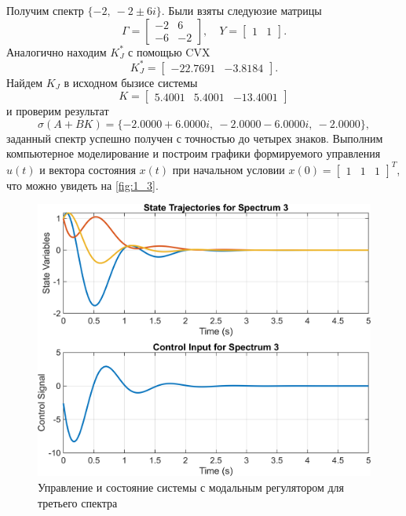 Получим спектр $\{-2,\ -2\pm 6i\}$. Были взяты следуюзие матрицы
\begin{equation*}
    \Gamma=\begin{bmatrix}
        -2&  6\\
        -6& -2
    \end{bmatrix},\quad
    Y=\begin{bmatrix}
        1& 1
    \end{bmatrix}.
\end{equation*}
Аналогично находим $K_J^*$ с помощью CVX
\begin{equation*}
    K_J^*=\begin{bmatrix}
        -22.7691&	-3.8184
    \end{bmatrix}.
\end{equation*}
Найдем $K_J$ в исходном бызисе
системы
\begin{equation*}
    K=\begin{bmatrix}
        5.4001&	5.4001&	-13.4001
    \end{bmatrix}
\end{equation*}
и проверим результат
\begin{equation*}
    \sigma(A+BK)=\{-2.0000 + 6.0000i,\ 
    -2.0000 - 6.0000i,\ 
    -2.0000\},
\end{equation*}
заданный спектр успешно получен с точностью до четырех знаков. 
Выполним компьютерное моделирование и построим графики 
формируемого управления $u(t)$ и вектора 
состояния $x(t)$ при начальном условии 
$x(0) =\begin{bmatrix}
    1 & 1 & 1
\end{bmatrix}^T$, что можно увидеть на \autoref{fig:1_3}.

\begin{figure}[H]
    \centering
    \includegraphics[width=0.8\linewidth]{figs/task1_3.png}
    \caption{Управление и состояние системы с модальным регулятором для третьего спектра}
    \label{fig:1_3}
\end{figure}

